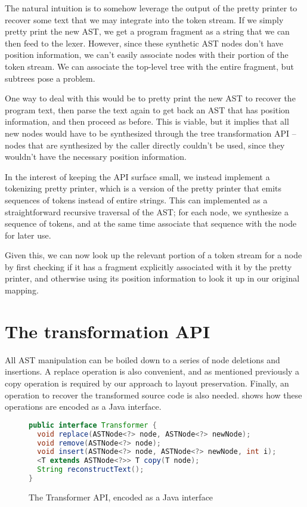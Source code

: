 The natural intuition is to somehow leverage the output of the pretty printer
to recover some text that we may integrate into the token stream. If we simply
pretty print the new AST, we get a program fragment as a string that we can
then feed to the lexer. However, since these synthetic AST nodes don't have
position information, we can't easily associate nodes with their portion of the
token stream. We can associate the top-level tree with the entire fragment, but
subtrees pose a problem.

One way to deal with this would be to pretty print the new AST to recover the
program text, then parse the text again to get back an AST that has position
information, and then proceed as before. This is viable, but it implies that
all new nodes would have to be synthesized through the tree transformation API
-- nodes that are synthesized by the caller directly couldn't be used, since
they wouldn't have the necessary position information.

In the interest of keeping the API surface small, we instead implement a
tokenizing pretty printer, which is a version of the pretty printer that emits
sequences of tokens instead of entire strings. This can implemented as a
straightforward recursive traversal of the AST; for each node, we synthesize a
sequence of tokens, and at the same time associate that sequence with the node
for later use.

Given this, we can now look up the relevant portion of a token stream for a node
by first checking if it has a fragment explicitly associated with it by the
pretty printer, and otherwise using its position information to look it up in
our original mapping.

\section{The transformation API}
All AST manipulation can be boiled down to a series of node deletions and insertions.
A replace operation is also convenient, and as mentioned previously a copy operation
is required by our approach to layout preservation. Finally, an operation to recover
the transformed source code is also needed.  shows how
these operations are encoded as a Java interface.

\begin{figure}
\begin{lstlisting}[numbers=none, language=Java]
public interface Transformer {
  void replace(ASTNode<?> node, ASTNode<?> newNode);
  void remove(ASTNode<?> node);
  void insert(ASTNode<?> node, ASTNode<?> newNode, int i);
  <T extends ASTNode<?>> T copy(T node);
  String reconstructText();
}
\end{lstlisting}
\caption{The Transformer API, encoded as a Java interface}
\label{Fig:TransformerAPI}
\end{figure}

